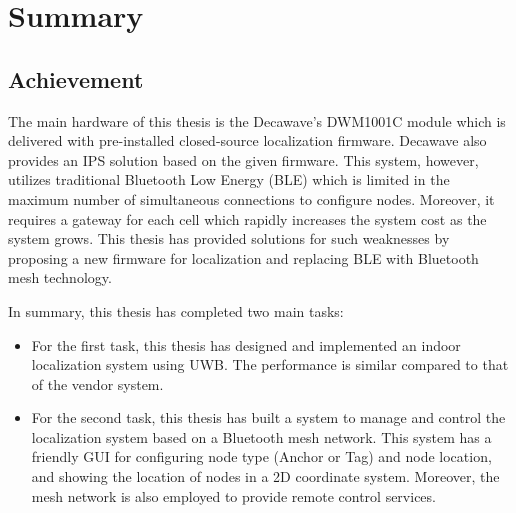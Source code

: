 \documentclass[\main/main.tex]{subfiles}
\begin{document}
\graphicspath{{img/}{summary/img/}}

\chapter{Summary}

\section{Achievement}
The main hardware of this thesis is the Decawave's DWM1001C module which is delivered with pre-installed closed-source localization firmware. Decawave also provides an IPS solution based on the given firmware. This system, however, utilizes traditional Bluetooth Low Energy (BLE) which is limited in the maximum number of simultaneous connections to configure nodes. Moreover, it requires a gateway for each cell which rapidly increases the system cost as the system grows. This thesis has provided solutions for such weaknesses by proposing a new firmware for localization and replacing BLE with Bluetooth mesh technology.

In summary, this thesis has completed two main tasks:
\begin{itemize}
    \item For the first task, this thesis has designed and implemented an indoor localization system using UWB. The performance is similar compared to that of the vendor system.
    \item For the second task, this thesis has built a system to manage and control the localization system based on a Bluetooth mesh network. This system has a friendly GUI for configuring node type (Anchor or Tag) and node location, and showing the location of nodes in a 2D coordinate system. Moreover, the mesh network is also employed to provide remote control services.
\end{itemize}
\end{document}
